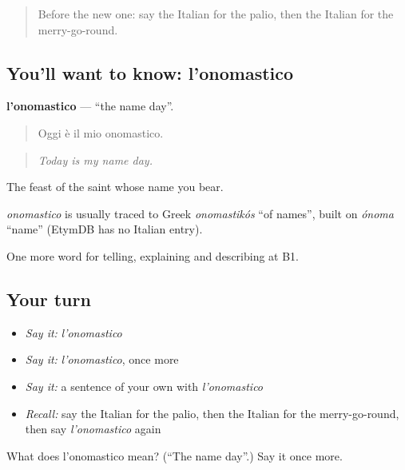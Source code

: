 \begin{quote}
Before the new one: say the Italian for the palio, then the Italian for the merry-go-round.
\end{quote}

\subsection*{You'll want to know: l'onomastico}
\textbf{l'onomastico} — \textquotedblleft{}the name day\textquotedblright{}.

\begin{quote}
Oggi è il mio onomastico.
\end{quote}

\begin{quote}
\emph{Today is my name day.}
\end{quote}

The feast of the saint whose name you bear.

\begin{cousinweb}
\emph{onomastico} is usually traced to Greek \emph{onomastikós} \textquotedblleft{}of names\textquotedblright{}, built on \emph{ónoma} \textquotedblleft{}name\textquotedblright{} (EtymDB has no Italian entry).
\end{cousinweb}

\begin{grammarlens}[title={What you've built}]
One more word for telling, explaining and describing at B1.
\end{grammarlens}

\subsection*{Your turn}
\begin{itemize}
\raggedright
  \item \emph{Say it:} \emph{l'onomastico}
  \item \emph{Say it:} \emph{l'onomastico}, once more
  \item \emph{Say it:} a sentence of your own with \emph{l'onomastico}
  \item \emph{Recall:} say the Italian for the palio, then the Italian for the merry-go-round, then say \emph{l'onomastico} again
\end{itemize}

\begin{tcolorbox}[breakable,colback=teal!4,colframe=teal!35!black,title={Before you move on}]
What does l'onomastico mean? (\textquotedblleft{}The name day\textquotedblright{}.) Say it once more.
\end{tcolorbox}
